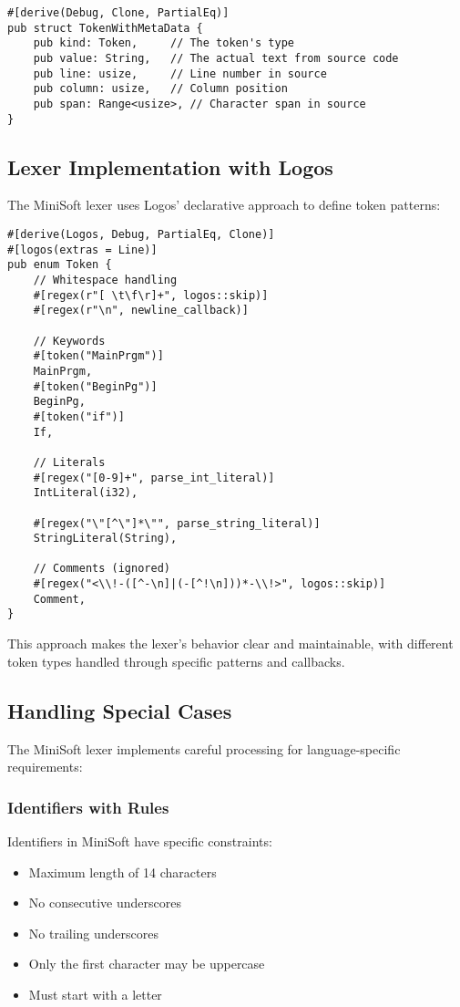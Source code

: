 \documentclass[12pt,a4paper]{article}
\begin{document}
\begin{lstlisting}[caption={Token Structure}]
#[derive(Debug, Clone, PartialEq)]
pub struct TokenWithMetaData {
    pub kind: Token,     // The token's type
    pub value: String,   // The actual text from source code
    pub line: usize,     // Line number in source
    pub column: usize,   // Column position
    pub span: Range<usize>, // Character span in source
}
\end{lstlisting}

\subsection{Lexer Implementation with Logos}
The MiniSoft lexer uses Logos' declarative approach to define token patterns:

\begin{lstlisting}[caption={Sample Token Definitions}]
#[derive(Logos, Debug, PartialEq, Clone)]
#[logos(extras = Line)]
pub enum Token {
    // Whitespace handling
    #[regex(r"[ \t\f\r]+", logos::skip)]
    #[regex(r"\n", newline_callback)]
    
    // Keywords
    #[token("MainPrgm")]
    MainPrgm,
    #[token("BeginPg")]
    BeginPg,
    #[token("if")]
    If,
    
    // Literals
    #[regex("[0-9]+", parse_int_literal)]
    IntLiteral(i32),
    
    #[regex("\"[^\"]*\"", parse_string_literal)]
    StringLiteral(String),
    
    // Comments (ignored)
    #[regex("<\\!-([^-\n]|(-[^!\n]))*-\\!>", logos::skip)]
    Comment,
}
\end{lstlisting}

This approach makes the lexer's behavior clear and maintainable, with different token types handled through specific patterns and callbacks.

\subsection{Handling Special Cases}
The MiniSoft lexer implements careful processing for language-specific requirements:

\subsubsection{Identifiers with Rules}
Identifiers in MiniSoft have specific constraints:
\begin{itemize}
	\item Maximum length of 14 characters
	\item No consecutive underscores
	\item No trailing underscores
	\item Only the first character may be uppercase
	\item Must start with a letter
\end{itemize}
\end{document}
